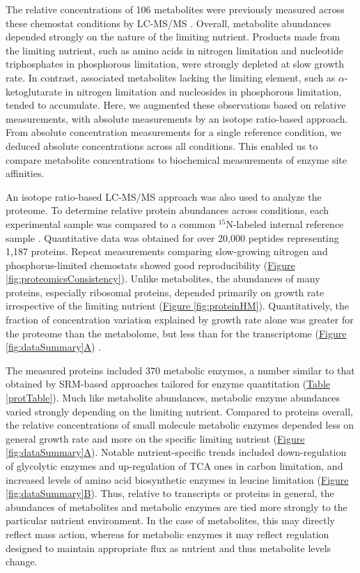The relative concentrations of 106 metabolites were previously measured across these chemostat conditions by LC-MS/MS \cite{Boer:2010fb}. Overall, metabolite abundances depended strongly on the nature of the limiting nutrient. Products made from the limiting nutrient, such as amino acids in nitrogen limitation and nucleotide triphosphates in phosphorous limitation, were strongly depleted at slow growth rate. In contrast, associated metabolites lacking the limiting element, such as $\alpha$-ketoglutarate in nitrogen limitation and nucleosides in phosphorous limitation, tended to accumulate. Here, we augmented these observations based on relative measurements, with absolute measurements by an isotope ratio-based approach. From absolute concentration measurements for a single reference condition, we deduced absolute concentrations across all conditions. This enabled us to compare metabolite concentrations to biochemical measurements of enzyme site affinities. 

An isotope ratio-based LC-MS/MS approach was also used to analyze the proteome. To determine relative protein abundances across conditions, each experimental sample was compared to a common $^{15}$N-labeled internal reference sample \cite{Oda:1999uz,Ong:2002tf}. Quantitative data was obtained for over 20,000 peptides representing 1,187 proteins. Repeat measurements comparing slow-growing nitrogen and phosphorus-limited chemostats showed good reproducibility (\hyperref[fig:proteomicsConsistency]{Figure \ref{fig:proteomicsConsistency}}). Unlike metabolites, the abundances of many proteins, especially ribosomal proteins, depended primarily on growth rate irrespective of the limiting nutrient (\hyperref[fig:proteinHM]{Figure \ref{fig:proteinHM}}). Quantitatively, the fraction of concentration variation explained by growth rate alone was greater for the proteome than the metabolome, but less than for the transcriptome (\hyperref[fig:dataSummary]{Figure \ref{fig:dataSummary}A}) \cite{Brauer:2008jn}.

The measured proteins included 370 metabolic enzymes, a number similar to that obtained by SRM-based approaches tailored for enzyme quantitation \cite{Costenoble:2011hia, Zampar:2013fr} (\hyperref[protTable]{Table \ref{protTable}}). Much like metabolite abundances, metabolic enzyme abundances varied strongly depending on the limiting nutrient. Compared to proteins overall, the relative concentrations of small molecule metabolic enzymes depended less on general growth rate and more on the specific limiting nutrient (\hyperref[fig:dataSummary]{Figure \ref{fig:dataSummary}A}). Notable nutrient-specific trends included down-regulation of glycolytic enzymes and up-regulation of TCA ones in carbon limitation, and increased levels of amino acid biosynthetic enzymes in leucine limitation (\hyperref[fig:dataSummary]{Figure \ref{fig:dataSummary}B}). Thus, relative to transcripts or proteins in general, the abundances of metabolites and metabolic enzymes are tied more strongly to the particular nutrient environment. In the case of metabolites, this may directly reflect mass action, whereas for metabolic enzymes it may reflect regulation designed to maintain appropriate flux as nutrient and thus metabolite levels change.

